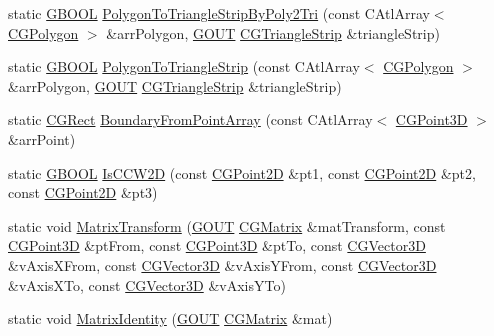 \begin{DoxyCompactItemize}
\item 
static \hyperlink{_g_types_8h_a2901915743626352a6820c5405f556dc}{G\+B\+O\+O\+L} \hyperlink{class_c_g_math_a5e322e6b450e25be8e98c93ff803f314}{Polygon\+To\+Triangle\+Strip\+By\+Poly2\+Tri} (const C\+Atl\+Array$<$ \hyperlink{_g_polyline3_d_8h_aaff14096de7e2f1a640c0942e4bd70da}{C\+G\+Polygon} $>$ \&arr\+Polygon, \hyperlink{_g_types_8h_a0858ec221262e635612871d70ca233ad}{G\+O\+U\+T} \hyperlink{class_c_g_triangle_strip}{C\+G\+Triangle\+Strip} \&triangle\+Strip)
\item 
static \hyperlink{_g_types_8h_a2901915743626352a6820c5405f556dc}{G\+B\+O\+O\+L} \hyperlink{class_c_g_math_ae82d5a794bde42d891c0028f8ba869d3}{Polygon\+To\+Triangle\+Strip} (const C\+Atl\+Array$<$ \hyperlink{_g_polyline3_d_8h_aaff14096de7e2f1a640c0942e4bd70da}{C\+G\+Polygon} $>$ \&arr\+Polygon, \hyperlink{_g_types_8h_a0858ec221262e635612871d70ca233ad}{G\+O\+U\+T} \hyperlink{class_c_g_triangle_strip}{C\+G\+Triangle\+Strip} \&triangle\+Strip)
\item 
static \hyperlink{class_c_g_rect}{C\+G\+Rect} \hyperlink{class_c_g_math_ac3b11b5e4cd4f7900a60164d3cc0da18}{Boundary\+From\+Point\+Array} (const C\+Atl\+Array$<$ \hyperlink{class_c_g_point3_d}{C\+G\+Point3\+D} $>$ \&arr\+Point)
\item 
static \hyperlink{_g_types_8h_a2901915743626352a6820c5405f556dc}{G\+B\+O\+O\+L} \hyperlink{class_c_g_math_adaef8e61a5d5de6cce106ee177f8cbe4}{Is\+C\+C\+W2\+D} (const \hyperlink{class_c_g_point2_d}{C\+G\+Point2\+D} \&pt1, const \hyperlink{class_c_g_point2_d}{C\+G\+Point2\+D} \&pt2, const \hyperlink{class_c_g_point2_d}{C\+G\+Point2\+D} \&pt3)
\item 
static void \hyperlink{class_c_g_math_a28f443611d5a02240443ba6644cf7810}{Matrix\+Transform} (\hyperlink{_g_types_8h_a0858ec221262e635612871d70ca233ad}{G\+O\+U\+T} \hyperlink{class_c_g_matrix}{C\+G\+Matrix} \&mat\+Transform, const \hyperlink{class_c_g_point3_d}{C\+G\+Point3\+D} \&pt\+From, const \hyperlink{class_c_g_point3_d}{C\+G\+Point3\+D} \&pt\+To, const \hyperlink{_g_point3_d_8h_aa7e73d39f4c991acb5a13c84b498366d}{C\+G\+Vector3\+D} \&v\+Axis\+X\+From, const \hyperlink{_g_point3_d_8h_aa7e73d39f4c991acb5a13c84b498366d}{C\+G\+Vector3\+D} \&v\+Axis\+Y\+From, const \hyperlink{_g_point3_d_8h_aa7e73d39f4c991acb5a13c84b498366d}{C\+G\+Vector3\+D} \&v\+Axis\+X\+To, const \hyperlink{_g_point3_d_8h_aa7e73d39f4c991acb5a13c84b498366d}{C\+G\+Vector3\+D} \&v\+Axis\+Y\+To)
\item 
static void \hyperlink{class_c_g_math_a11a1609dbae99a47b518b0a18a403733}{Matrix\+Identity} (\hyperlink{_g_types_8h_a0858ec221262e635612871d70ca233ad}{G\+O\+U\+T} \hyperlink{class_c_g_matrix}{C\+G\+Matrix} \&mat)

\end{DoxyCompactItemize}
